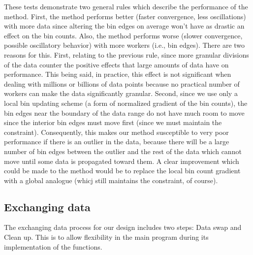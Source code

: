 \documentclass{article}
\begin{document}
These tests demonstrate two general rules which describe the performance of the method. First, the method performs better (faster convergence, less oscillations) with more data since altering the bin edges on average won't have as drastic an effect on the bin counts. Also, the method performs worse (slower convergence, possible oscillatory behavior) with more workers (i.e., bin edges). There are two reasons for this. First, relating to the previous rule, since more granular divisions of the data counter the positive effects that large amounts of data have on performance. This being said, in practice, this effect is not significant when dealing with millions or billions of data points because no practical number of workers can make the data significantly granular. Second, since we use only a local bin updating scheme (a form of normalized gradient of the bin counts), the bin edges near the boundary of the data range do not have much room to move since the interior bin edges must move first (since we must maintain the constraint). Consequently, this makes our method susceptible to very poor performance if there is an outlier in the data, because there will be a large number of bin edges between the outlier and the rest of the data which cannot move until some data is propagated toward them. A clear improvement which could be made to the method would be to replace the local bin count gradient with a global analogue (whicj still maintains the constraint, of course).





\subsection{Exchanging data}
The exchanging data process for our design includes two steps: Data swap and Clean up. This is to allow flexibility in the main program during its implementation of the functions. 
\end{document}
